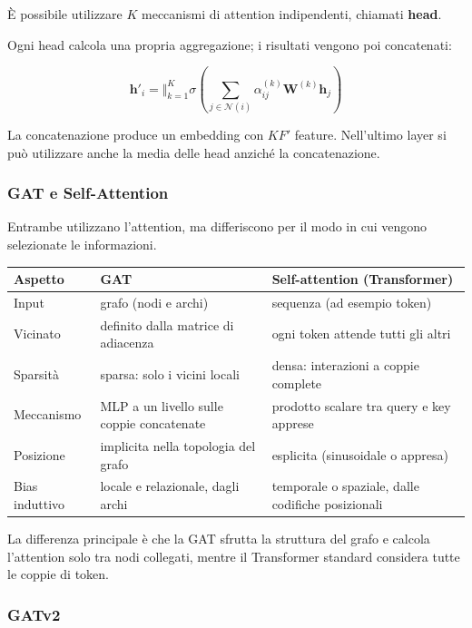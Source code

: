 \documentclass[11pt,a4paper]{article}
\begin{document}
È possibile utilizzare $K$ meccanismi di attention
indipendenti, chiamati \textbf{head}.

Ogni head calcola una propria aggregazione; i risultati
vengono poi concatenati:

\[
\mathbf{h}'_i=
\big\Vert_{k=1}^{K}
\sigma\left(
\sum_{j\in\mathcal{N}(i)}
\alpha_{ij}^{(k)}
\mathbf{W}^{(k)}\mathbf{h}_j
\right)
\]

La concatenazione produce un embedding con $KF'$ feature.
Nell'ultimo layer si può utilizzare anche la media
delle head anziché la concatenazione.

\subsubsection{GAT e Self-Attention}

Entrambe utilizzano l'attention, ma differiscono
per il modo in cui vengono selezionate le informazioni.

\begin{center}
\renewcommand{\arraystretch}{1.35}
\begin{tabular}{|p{3.2cm}|p{5.9cm}|p{5.9cm}|}
\hline
\textbf{Aspetto} & \textbf{GAT} & \textbf{Self-attention (Transformer)} \\
\hline
Input & grafo (nodi e archi) & sequenza (ad esempio token) \\
\hline
Vicinato & definito dalla matrice di adiacenza & ogni token attende tutti gli altri \\
\hline
Sparsità & sparsa: solo i vicini locali & densa: interazioni a coppie complete \\
\hline
Meccanismo & MLP a un livello sulle coppie concatenate & prodotto scalare tra query e key apprese \\
\hline
Posizione & implicita nella topologia del grafo & esplicita (sinusoidale o appresa) \\
\hline
Bias induttivo & locale e relazionale, dagli archi & temporale o spaziale, dalle codifiche posizionali \\
\hline
\end{tabular}
\end{center}

La differenza principale è che la GAT sfrutta la struttura
del grafo e calcola l'attention solo tra nodi collegati,
mentre il Transformer standard considera tutte le coppie
di token.

\subsubsection{GATv2}
\end{document}
